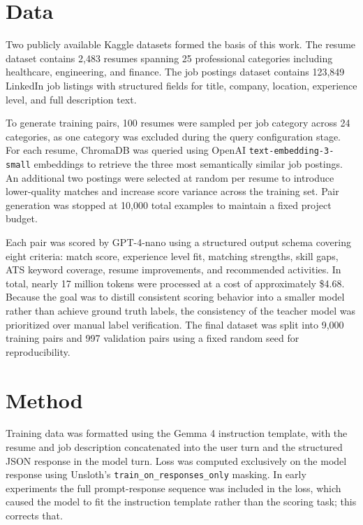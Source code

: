 \documentclass[10pt,twocolumn,letterpaper]{article}
\begin{document}
\section{Data}

Two publicly available Kaggle datasets formed the basis of this work. The resume dataset \cite{resumedata} contains 2,483 resumes spanning 25 professional categories including healthcare, engineering, and finance. The job postings dataset \cite{jobdata} contains 123,849 LinkedIn job listings with structured fields for title, company, location, experience level, and full description text.

To generate training pairs, 100 resumes were sampled per job category across 24 categories, as one category was excluded during the query configuration stage. For each resume, ChromaDB was queried using OpenAI \texttt{text-embedding-3-small} embeddings to retrieve the three most semantically similar job postings. An additional two postings were selected at random per resume to introduce lower-quality matches and increase score variance across the training set. Pair generation was stopped at 10,000 total examples to maintain a fixed project budget.

Each pair was scored by GPT-4-nano using a structured output schema covering eight criteria: match score, experience level fit, matching strengths, skill gaps, ATS keyword coverage, resume improvements, and recommended activities. In total, nearly 17 million tokens were processed at a cost of approximately \$4.68. Because the goal was to distill consistent scoring behavior into a smaller model rather than achieve ground truth labels, the consistency of the teacher model was prioritized over manual label verification. The final dataset was split into 9,000 training pairs and 997 validation pairs using a fixed random seed for reproducibility.

\section{Method}

Training data was formatted using the Gemma 4 instruction template, with the resume and job description concatenated into the user turn and the structured JSON response in the model turn. Loss was computed exclusively on the model response using Unsloth's \texttt{train\_on\_responses\_only} masking. In early experiments the full prompt-response sequence was included in the loss, which caused the model to fit the instruction template rather than the scoring task; this corrects that.
\end{document}
